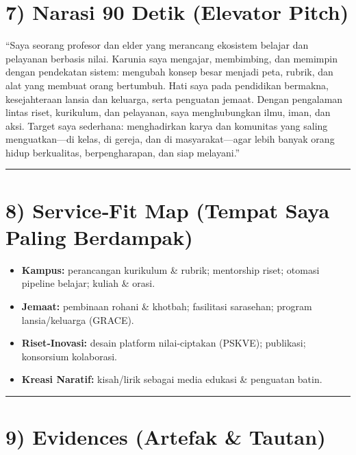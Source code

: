 \documentclass[
  letterpaper,
  DIV=11,
  numbers=noendperiod]{scrreprt}
\providecommand{\tightlist}{%
  \setlength{\itemsep}{0pt}\setlength{\parskip}{0pt}}
\begin{document}
\section{7) Narasi 90 Detik (Elevator
Pitch)}\label{narasi-90-detik-elevator-pitch}

``Saya seorang profesor dan elder yang merancang ekosistem belajar dan
pelayanan berbasis nilai. Karunia saya mengajar, membimbing, dan
memimpin dengan pendekatan sistem: mengubah konsep besar menjadi peta,
rubrik, dan alat yang membuat orang bertumbuh. Hati saya pada pendidikan
bermakna, kesejahteraan lansia dan keluarga, serta penguatan jemaat.
Dengan pengalaman lintas riset, kurikulum, dan pelayanan, saya
menghubungkan ilmu, iman, dan aksi. Target saya sederhana: menghadirkan
karya dan komunitas yang saling menguatkan---di kelas, di gereja, dan di
masyarakat---agar lebih banyak orang hidup berkualitas, berpengharapan,
dan siap melayani.''

\begin{center}\rule{0.5\linewidth}{0.5pt}\end{center}

\section{8) Service‑Fit Map (Tempat Saya Paling
Berdampak)}\label{servicefit-map-tempat-saya-paling-berdampak}

\begin{itemize}
\tightlist
\item
  \textbf{Kampus:} perancangan kurikulum \& rubrik; mentorship riset;
  otomasi pipeline belajar; kuliah \& orasi.
\item
  \textbf{Jemaat:} pembinaan rohani \& khotbah; fasilitasi sarasehan;
  program lansia/keluarga (GRACE).
\item
  \textbf{Riset‑Inovasi:} desain platform nilai‑ciptakan (PSKVE);
  publikasi; konsorsium kolaborasi.
\item
  \textbf{Kreasi Naratif:} kisah/lirik sebagai media edukasi \&
  penguatan batin.
\end{itemize}

\begin{center}\rule{0.5\linewidth}{0.5pt}\end{center}

\section{9) Evidences (Artefak \&
Tautan)}\label{evidences-artefak-tautan}
\end{document}
